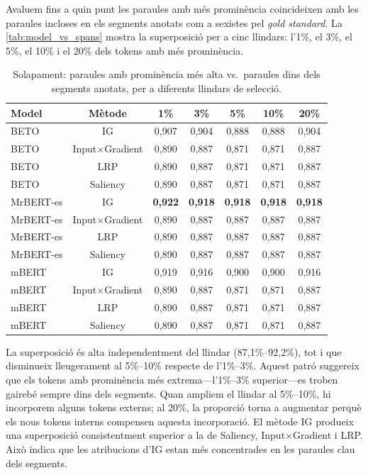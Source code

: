 Avaluem fins a quin punt les paraules amb més prominència coincideixen amb les paraules incloses en els segments anotats com a sexistes pel \textit{gold standard}.
La \autoref{tab:model_vs_spans} mostra la superposició per a cinc llindars: l'1\%, el 3\%, el 5\%, el 10\% i el 20\% dels tokens amb més prominència.
\iftables
\begin{table}[htbp]
\small
\centering
\begin{tabular}{lcccccc}
\toprule
\textbf{Model} & \textbf{Mètode} & \textbf{1\%} & \textbf{3\%} & \textbf{5\%} & \textbf{10\%} & \textbf{20\%} \\
\midrule
BETO & IG & 0,907 & 0,904 & 0,888 & 0,888 & 0,904 \\
BETO & Input$\times$Gradient & 0,890 & 0,887 & 0,871 & 0,871 & 0,887 \\
BETO & LRP & 0,890 & 0,887 & 0,871 & 0,871 & 0,887 \\
BETO & Saliency & 0,890 & 0,887 & 0,871 & 0,871 & 0,887 \\
MrBERT-es & IG & \textbf{0,922} & \textbf{0,918} & \textbf{0,918} & \textbf{0,918} & \textbf{0,918} \\
MrBERT-es & Input$\times$Gradient & 0,890 & 0,887 & 0,887 & 0,887 & 0,887 \\
MrBERT-es & LRP & 0,890 & 0,887 & 0,887 & 0,887 & 0,887 \\
MrBERT-es & Saliency & 0,890 & 0,887 & 0,887 & 0,887 & 0,887 \\
mBERT & IG & 0,919 & 0,916 & 0,900 & 0,900 & 0,916 \\
mBERT & Input$\times$Gradient & 0,890 & 0,887 & 0,871 & 0,871 & 0,887 \\
mBERT & LRP & 0,890 & 0,887 & 0,871 & 0,871 & 0,887 \\
mBERT & Saliency & 0,890 & 0,887 & 0,871 & 0,871 & 0,887 \\
\bottomrule
\end{tabular}
\caption{Solapament: paraules amb prominència més alta vs.\ paraules dins dels segments anotats, per a diferents llindars de selecció.}
\label{tab:model_vs_spans}
\end{table}
\fi
La superposició és alta independentment del llindar (87,1\%--92,2\%), tot i que disminueix lleugerament al 5\%--10\% respecte de l'1\%--3\%.
Aquest patró suggereix que els tokens amb prominència més extrema---l'1\%--3\% superior---es troben gairebé sempre dins dels segments. Quan ampliem el llindar al 5\%--10\%, hi incorporem alguns tokens externs; al 20\%, la proporció torna a augmentar perquè els nous tokens interns compensen aquesta incorporació.
El mètode IG produeix una superposició consistentment superior a la de Saliency, Input$\times$Gradient i LRP.
Això indica que les atribucions d'IG estan més concentrades en les paraules clau dels segments.

